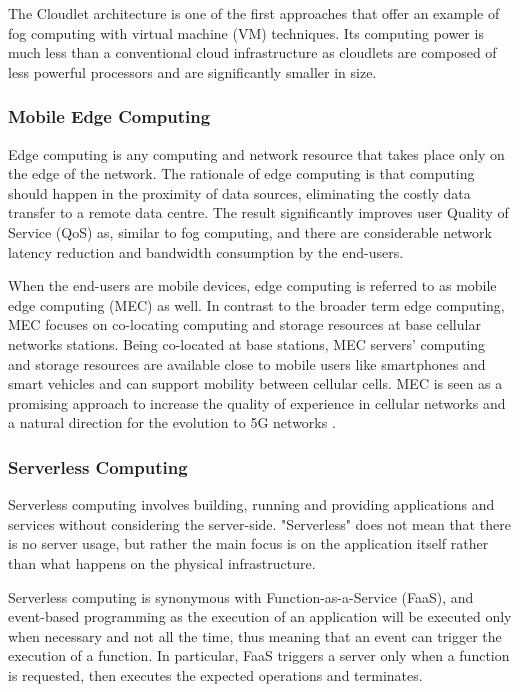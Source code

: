 \documentclass{ieeeaccess}
\begin{document}
The Cloudlet \cite{cloudlet} architecture is one of the first approaches that offer an example of fog computing with virtual machine (VM) techniques. Its computing power is much less than a conventional cloud infrastructure as cloudlets are composed of less powerful processors and are significantly smaller in size.

\subsubsection{Mobile Edge Computing}

Edge computing \cite{edge-computing-vision-challenges} is any computing and network resource that takes place only on the edge of the network. The rationale of edge computing is that computing should happen in the proximity of data sources, eliminating the costly data transfer to a remote data centre. The result significantly improves user Quality of Service (QoS) as, similar to fog computing, and there are considerable network latency reduction and bandwidth consumption by the end-users.

When the end-users are mobile devices, edge computing is referred to as mobile edge computing (MEC) as well. In contrast to the broader term edge computing, MEC focuses on co-locating computing and storage resources at base cellular networks stations. Being co-located at base stations, MEC servers' computing and storage resources are available close to mobile users like smartphones and smart vehicles and can support mobility between cellular cells. MEC is seen as a promising approach to increase the quality of experience in cellular networks and a natural direction for the evolution to 5G networks \cite{nfv-5g}.

\subsubsection{Serverless Computing}

Serverless computing \cite{serverless-berkeley} involves building, running and providing applications and services without considering the server-side. "Serverless" does not mean that there is no server usage, but rather the main focus is on the application itself rather than what happens on the physical infrastructure.

Serverless computing is synonymous with Function-as-a-Service (FaaS), and event-based programming as the execution of an application will be executed only when necessary and not all the time, thus meaning that an event can trigger the execution of a function. In particular, FaaS triggers a server only when a function is requested, then executes the expected operations and terminates.
\end{document}
